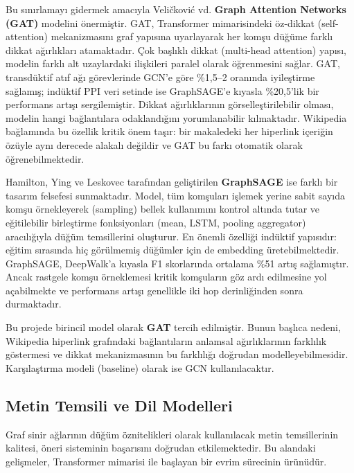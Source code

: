 \documentclass[12pt, a4paper]{article}
\begin{document}
Bu sınırlamayı gidermek amacıyla Veličković vd.\@ \cite{velickovic2018graph} \textbf{Graph Attention Networks (GAT)} modelini önermiştir. GAT, Transformer mimarisindeki öz-dikkat (self-attention) mekanizmasını graf yapısına uyarlayarak her komşu düğüme farklı dikkat ağırlıkları atamaktadır. Çok başlıklı dikkat (multi-head attention) yapısı, modelin farklı alt uzaylardaki ilişkileri paralel olarak öğrenmesini sağlar. GAT, transdüktif atıf ağı görevlerinde GCN'e göre \%1,5--2 oranında iyileştirme sağlamış; indüktif PPI veri setinde ise GraphSAGE'e kıyasla \%20,5'lik bir performans artışı sergilemiştir. Dikkat ağırlıklarının görselleştirilebilir olması, modelin hangi bağlantılara odaklandığını yorumlanabilir kılmaktadır. Wikipedia bağlamında bu özellik kritik önem taşır: bir makaledeki her hiperlink içeriğin özüyle aynı derecede alakalı değildir ve GAT bu farkı otomatik olarak öğrenebilmektedir.

Hamilton, Ying ve Leskovec \cite{hamilton2017inductive} tarafından geliştirilen \textbf{GraphSAGE} ise farklı bir tasarım felsefesi sunmaktadır. Model, tüm komşuları işlemek yerine sabit sayıda komşu örnekleyerek (sampling) bellek kullanımını kontrol altında tutar ve eğitilebilir birleştirme fonksiyonları (mean, LSTM, pooling aggregator) aracılığıyla düğüm temsillerini oluşturur. En önemli özelliği indüktif yapısıdır: eğitim sırasında hiç görülmemiş düğümler için de embedding üretebilmektedir. GraphSAGE, DeepWalk'a kıyasla F1 skorlarında ortalama \%51 artış sağlamıştır. Ancak rastgele komşu örneklemesi kritik komşuların göz ardı edilmesine yol açabilmekte ve performans artışı genellikle iki hop derinliğinden sonra durmaktadır.

Bu projede birincil model olarak \textbf{GAT} tercih edilmiştir. Bunun başlıca nedeni, Wikipedia hiperlink grafındaki bağlantıların anlamsal ağırlıklarının farklılık göstermesi ve dikkat mekanizmasının bu farklılığı doğrudan modelleyebilmesidir. Karşılaştırma modeli (baseline) olarak ise GCN kullanılacaktır.

\subsection{Metin Temsili ve Dil Modelleri}

Graf sinir ağlarının düğüm öznitelikleri olarak kullanılacak metin temsillerinin kalitesi, öneri sisteminin başarısını doğrudan etkilemektedir. Bu alandaki gelişmeler, Transformer mimarisi ile başlayan bir evrim sürecinin ürünüdür.
\end{document}
